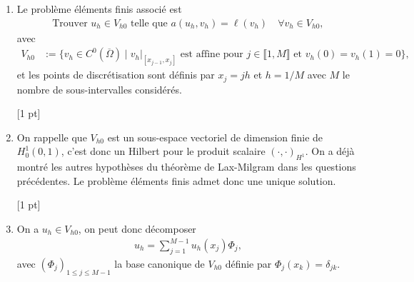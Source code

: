 \documentclass[12pt]{article}
\begin{document}
\begin{cor}
\begin{enumerate}
    $\bullet$ $a$ est une forme bilin\'eaire sur $V$.
    Elle est continue car
    \begin{align*}
      | a(u,v) |
      &= \left| \int_{\Omega} (u'v' + u'v + u v) \right|
        \leq \left| \int_{\Omega} (u'v' + u v) \right|
        + \left| \int_{\Omega} u'v \right|
      \\
      &\leq \| u \|_{H^1} \| v \|_{H^1}
        + \left(\int_{\Omega} (u')^2 \right)^{\frac12} \left(\int_{\Omega} v^2 \right)^{\frac12}
      \leq 2 \| u \|_{H^1} \| v \|_{H^1} ,
    \end{align*}
    o\`u on a utilis\'e l'in\'egalit\'e de Cauchy-Schwarz.

    $\bullet$ $a$ est coercive car
    pour $v \in H^1_0(0,1)$, on a $a(v,v) = \int_0^1 (v')^2 + v'v + v^2 = \| v \|_{H^1}^2$.
    

    En appliquant le th\'eor\`eme de Lax-Milgram, le probl\`eme~\eqref{eq:pb_var}
    admet une unique solution.
    
    [3 pts]

  \item Le probl\`eme \'el\'ements finis associ\'e est
    \begin{align*}
      \text{Trouver } u_h \in V_{h0} \text{ telle que }
      a(u_h , v_h) = \ell(v_h) \quad \forall v_h \in V_{h0} ,
    \end{align*}
    avec
    \begin{align*}
      V_{h0}
      &:= \{ v_h \in C^0(\overline{\Omega}) \; | \; v_h \vert_{[x_{j-1} , x_{j}]} \text{ est affine pour }
         j \in \llbracket 1,M \rrbracket
        \text{ et } v_h(0) = v_h(1) = 0 \} ,
    \end{align*}
    et les points de discr\'etisation sont d\'efinis par $x_j = jh$ et $h = 1/M$
    avec $M$ le nombre de sous-intervalles consid\'er\'es.

    [1 pt]
    
  \item On rappelle que $V_{h0}$ est un sous-espace vectoriel de dimension finie de $H_0^1(0,1)$,
    c'est donc un Hilbert pour le produit scalaire $(\cdot,\cdot)_{H^1}$.
    On a d\'ej\`a montr\'e les autres hypoth\`eses du th\'eor\`eme de Lax-Milgram
    dans les questions pr\'ec\'edentes.
    Le probl\`eme \'el\'ements finis admet donc une unique solution.

    [1 pt]

  \item On a $u_h \in V_{h0}$, on peut donc d\'ecomposer
    \begin{align*}
      u_h = \sum_{j=1}^{M-1} u_h(x_j) \Phi_j ,
    \end{align*}
    avec $(\Phi_j)_{1 \leq j \leq M-1}$ la base canonique de $V_{h0}$ d\'efinie par
    $\Phi_j(x_k) = \delta_{jk}$.


\end{enumerate}
\end{cor}
\end{document}
